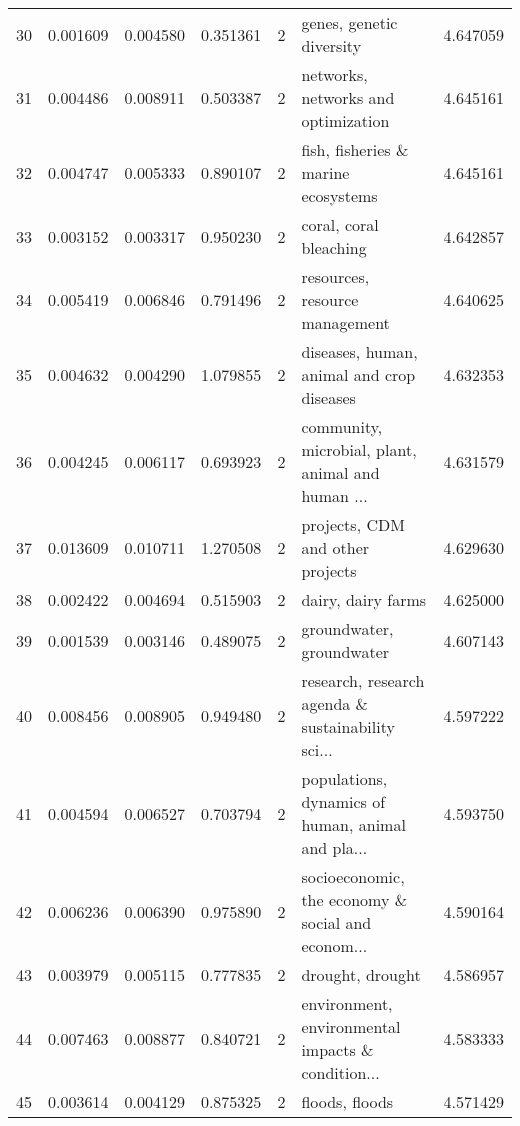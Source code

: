 \begin{tabular}{lrrrrlr}
30  &    0.001609 &  0.004580 &        0.351361 &           2 &                           genes, genetic diversity &  4.647059 \\
31  &    0.004486 &  0.008911 &        0.503387 &           2 &                networks, networks and optimization &  4.645161 \\
32  &    0.004747 &  0.005333 &        0.890107 &           2 &                fish, fisheries \& marine ecosystems &  4.645161 \\
33  &    0.003152 &  0.003317 &        0.950230 &           2 &                             coral, coral bleaching &  4.642857 \\
34  &    0.005419 &  0.006846 &        0.791496 &           2 &                     resources, resource management &  4.640625 \\
35  &    0.004632 &  0.004290 &        1.079855 &           2 &          diseases, human, animal and crop diseases &  4.632353 \\
36  &    0.004245 &  0.006117 &        0.693923 &           2 &  community, microbial, plant, animal and human ... &  4.631579 \\
37  &    0.013609 &  0.010711 &        1.270508 &           2 &                   projects, CDM and other projects &  4.629630 \\
38  &    0.002422 &  0.004694 &        0.515903 &           2 &                                 dairy, dairy farms &  4.625000 \\
39  &    0.001539 &  0.003146 &        0.489075 &           2 &                           groundwater, groundwater &  4.607143 \\
40  &    0.008456 &  0.008905 &        0.949480 &           2 &  research, research agenda \& sustainability sci... &  4.597222 \\
41  &    0.004594 &  0.006527 &        0.703794 &           2 &  populations, dynamics of human, animal and pla... &  4.593750 \\
42  &    0.006236 &  0.006390 &        0.975890 &           2 &  socioeconomic, the economy \& social and econom... &  4.590164 \\
43  &    0.003979 &  0.005115 &        0.777835 &           2 &                                   drought, drought &  4.586957 \\
44  &    0.007463 &  0.008877 &        0.840721 &           2 &  environment, environmental impacts \& condition... &  4.583333 \\
45  &    0.003614 &  0.004129 &        0.875325 &           2 &                                     floods, floods &  4.571429 \\

\end{tabular}
